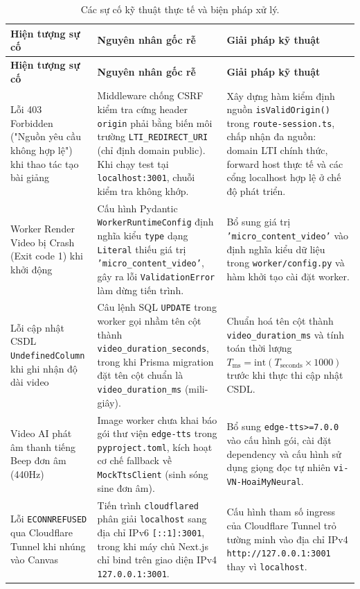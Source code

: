 \begin{longtable}{|p{3.5cm}|p{4.5cm}|p{5.5cm}|}
\caption{Các sự cố kỹ thuật thực tế và biện pháp xử lý.}
\label{tab:troubleshooting-lvtn} \\
\hline
\textbf{Hiện tượng sự cố} & \textbf{Nguyên nhân gốc rễ} & \textbf{Giải pháp kỹ thuật} \\
\hline
\endfirsthead
\hline
\textbf{Hiện tượng sự cố} & \textbf{Nguyên nhân gốc rễ} & \textbf{Giải pháp kỹ thuật} \\
\hline
\endhead

Lỗi 403 Forbidden ("Nguồn yêu cầu không hợp lệ") khi thao tác tạo bài giảng
    & Middleware chống CSRF kiểm tra cứng header \texttt{origin} phải bằng biến môi trường \texttt{LTI\_REDIRECT\_URI} (chỉ định domain public). Khi chạy test tại \texttt{localhost:3001}, chuỗi kiểm tra không khớp.
    & Xây dựng hàm kiểm định nguồn \texttt{isValidOrigin()} trong \texttt{route-session.ts}, chấp nhận đa nguồn: domain LTI chính thức, forward host thực tế và các cổng localhost hợp lệ ở chế độ phát triển. \\
\hline
Worker Render Video bị Crash (Exit code 1) khi khởi động
    & Cấu hình Pydantic \texttt{WorkerRuntimeConfig} định nghĩa kiểu \texttt{type} dạng \texttt{Literal} thiếu giá trị \texttt{'micro\_content\_video'}, gây ra lỗi \texttt{ValidationError} làm dừng tiến trình.
    & Bổ sung giá trị \texttt{'micro\_content\_video'} vào định nghĩa kiểu dữ liệu trong \texttt{worker/config.py} và hàm khởi tạo cài đặt worker. \\
\hline
Lỗi cập nhật CSDL \texttt{UndefinedColumn} khi ghi nhận độ dài video
    & Câu lệnh SQL \texttt{UPDATE} trong worker gọi nhầm tên cột thành \texttt{video\_duration\_seconds}, trong khi Prisma migration đặt tên cột chuẩn là \texttt{video\_duration\_ms} (mili-giây).
    & Chuẩn hoá tên cột thành \texttt{video\_duration\_ms} và tính toán thời lượng $T_{\text{ms}} = \text{int}(T_{\text{seconds}} \times 1000)$ trước khi thực thi cập nhật CSDL. \\
\hline
Video AI phát âm thanh tiếng Beep đơn âm (440Hz)
    & Image worker chưa khai báo gói thư viện \texttt{edge-tts} trong \texttt{pyproject.toml}, kích hoạt cơ chế fallback về \texttt{MockTtsClient} (sinh sóng sine đơn âm).
    & Bổ sung \texttt{edge-tts>=7.0.0} vào cấu hình gói, cài đặt dependency và cấu hình sử dụng giọng đọc tự nhiên \texttt{vi-VN-HoaiMyNeural}. \\
\hline
Lỗi \texttt{ECONNREFUSED} qua Cloudflare Tunnel khi nhúng vào Canvas
    & Tiến trình \texttt{cloudflared} phân giải \texttt{localhost} sang địa chỉ IPv6 \texttt{[::1]:3001}, trong khi máy chủ Next.js chỉ bind trên giao diện IPv4 \texttt{127.0.0.1:3001}.
    & Cấu hình tham số ingress của Cloudflare Tunnel trỏ tường minh vào địa chỉ IPv4 \texttt{http://127.0.0.1:3001} thay vì \texttt{localhost}. \\
\hline
\end{longtable}

